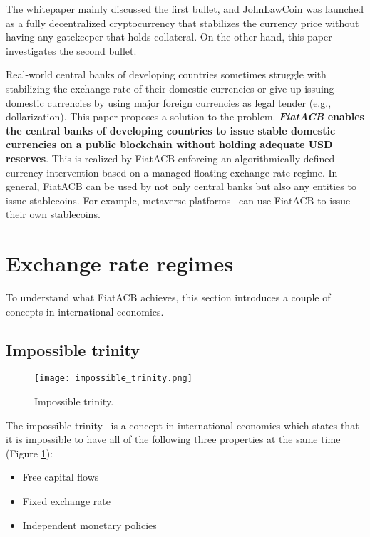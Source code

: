 \documentclass[dvipdfmx,a4paper]{article}
\begin{document}
The whitepaper mainly discussed the first bullet, and JohnLawCoin was launched as a fully decentralized cryptocurrency that stabilizes the currency price without having any gatekeeper that holds collateral. On the other hand, this paper investigates the second bullet.

Real-world central banks of developing countries sometimes struggle with stabilizing the exchange rate of their domestic currencies or give up issuing domestic currencies by using major foreign currencies as legal tender (e.g., dollarization). This paper proposes a solution to the problem. \textbf{\textit{FiatACB} enables the central banks of developing countries to issue stable domestic currencies on a public blockchain without holding adequate USD reserves}. This is realized by FiatACB enforcing an algorithmically defined currency intervention based on a managed floating exchange rate regime. In general, FiatACB can be used by not only central banks but also any entities to issue stablecoins. For example, metaverse platforms~\cite{duan2021metaverse,wang2021non} can use FiatACB to issue their own stablecoins.

\section{Exchange rate regimes}

To understand what FiatACB achieves, this section introduces a couple of concepts in international economics.

\subsection{Impossible trinity}

\begin{figure}[tb]
\centering
\texttt{[image: impossible\_trinity.png]}
\caption{Impossible trinity.}
\label{impossible_trinity}
\end{figure}

The impossible trinity~\cite{aizenman2013impossible} is a concept in international economics which states that it is impossible to have all of the following three properties at the same time (Figure \ref{impossible_trinity}):

\begin{itemize}
\item Free capital flows
\item Fixed exchange rate
\item Independent monetary policies
\end{itemize}
\end{document}
